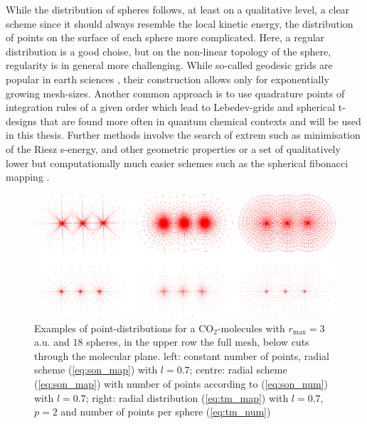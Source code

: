 While the distribution of spheres follows, at least on a qualitative level, a clear scheme since it should always resemble the local kinetic energy, the distribution of points on the surface of each sphere more complicated.
Here, a regular distribution is a good choise, but on the non-linear topology of the sphere, regularity is in general more challenging.
While so-called geodesic grids are popular in earth sciences \cite{geodesic1,geodesic2,geodes_charge}, their construction allows only for exponentially growing mesh-sizes.
Another common approach is to use quadrature points of integration rules of a given order which lead to Lebedev-grids \cite{lebedev,lebedev2} and spherical t-designs \cite{t-design1, t-design2} that are found more often in quantum chemical contexts \cite{LebQC1,LebQC2,lebDFT,lebDFT2} and will be used in this thesis.
Further methods involve the search of extrem such as minimisation of the Riesz s-energy, and other geometric properties \cite{fliegeMaier,womersley,wom2,wom3} or a set of qualitatively lower but computationally much easier schemes such as the spherical fibonacci mapping \cite{fibonacci,fibonacci2}.
\begin{figure}
   \includegraphics[width=\textwidth]{Figures/CO2_grid}
   \caption{Examples of point-distributions for a CO$_2$-molecules with $r_\text{max}=3\,$a.u. and $18$ spheres, in the upper row the full mesh, below cuts through the molecular plane.
   left: constant number of points, radial scheme (\ref{eq:son_map}) with $l=0.7$; centre: radial scheme (\ref{eq:son_map}) with number of points according to (\ref{eq:son_num}) with $l=0.7$; right: radial distribution (\ref{eq:tm_map}) with $l=0.7$, $p=2$ and number of points per sphere (\ref{eq:tm_num})}
   \label{fig:molmesh}
\end{figure}

